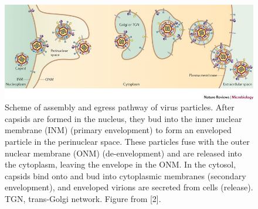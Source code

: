 \begin{figure}
  \includegraphics[width=\textwidth]{./viral_egress}
  \caption{Scheme of assembly and egress pathway of virus particles.
  After capsids are formed in the nucleus, they bud into the inner nuclear membrane (INM) (primary envelopment) to form an enveloped particle in the perinuclear space.
  These particles fuse with the outer nuclear membrane (ONM) (de-envelopment) and are released into the cytoplasm, leaving the envelope in the ONM.
  In the cytosol, capsids bind onto and bud into cytoplasmic membranes (secondary envelopment), and enveloped virions are secreted from cells (release).
  TGN, trans-Golgi network.
  Figure from [2].}
  \label{fig:viral_egress}
\end{figure}

